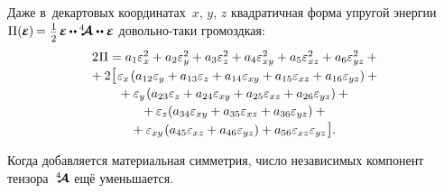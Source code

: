 \begin{otherlanguage}{russian}
\vspace{.1em} Даже в~декартовых координатах~$x$, $y$, $z$ квадратичная форма упругой энергии $\Pi(\hspace{-0.1ex}\mathboldepsilon\hspace{-0.1ex}) \hspace{-0.2ex}=\hspace{0.1ex} \smalldisplaystyleonehalf \hspace{.25ex} \mathboldepsilon \hspace{-0.1ex} \dotdotp \hspace{-0.1ex} \stiffnesstensor \dotdotp \mathboldepsilon$ довольно\hbox{-}таки громоздкая:
\begin{equation}\label{elasticenergylooongcartesian}
\begin{array}{c}
2 \hspace{0.1ex} \Pi = a_1 \varepsilon^2_{x} + a_2 \varepsilon^2_{y} + a_3 \varepsilon^2_{z} + a_4 \varepsilon^2_{xy} + a_5 \varepsilon^2_{xz} + a_6 \varepsilon^2_{yz} \:+ \\[0.2em]
+\: 2 \hspace{0.2ex} \scalebox{1.25}{$[$} \hspace{0.2ex}
\varepsilon_{x} \hspace{0.2ex} ( a_{12} \varepsilon_{y} + a_{13} \varepsilon_{z} + a_{14} \varepsilon_{xy} + a_{15} \varepsilon_{xz} + a_{16} \varepsilon_{yz} ) \:+ \\[0.2em]
+\: \varepsilon_{y} \hspace{0.2ex} ( a_{23} \varepsilon_{z} + a_{24} \varepsilon_{xy} + a_{25} \varepsilon_{xz} + a_{26} \varepsilon_{yz} ) \:+ \\[0.2em]
+\: \varepsilon_{z} ( a_{34} \varepsilon_{xy} + a_{35} \varepsilon_{xz} + a_{36} \varepsilon_{yz} ) \:+ \\[0.2em]
+\: \varepsilon_{xy} \hspace{0.2ex} ( a_{45} \varepsilon_{xz} + a_{46} \varepsilon_{yz} ) +
a_{56} \varepsilon_{xz} \varepsilon_{yz} \hspace{0.2ex} \scalebox{1.25}{$]$} \hspace{0.1ex} .
\end{array}\end{equation}

\vspace{0.1em} Когда добавляется материальная симметрия, число независимых компонент тензора~$\hspace{.08ex}{^4\hspace{-0.72ex}\bm{\mathcal{A}}}\hspace{.08ex}$ ещё уменьшается.


\end{otherlanguage}

